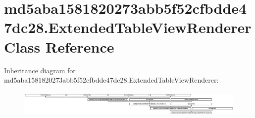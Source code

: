 \hypertarget{classmd5aba1581820273abb5f52cfbdde47dc28_1_1ExtendedTableViewRenderer}{}\section{md5aba1581820273abb5f52cfbdde47dc28.\+Extended\+Table\+View\+Renderer Class Reference}
\label{classmd5aba1581820273abb5f52cfbdde47dc28_1_1ExtendedTableViewRenderer}
Inheritance diagram for md5aba1581820273abb5f52cfbdde47dc28.\+Extended\+Table\+View\+Renderer\+:\begin{figure}[H]
\begin{center}
\leavevmode
\includegraphics[height=1.305361cm]{classmd5aba1581820273abb5f52cfbdde47dc28_1_1ExtendedTableViewRenderer}
\end{center}
\end{figure}
